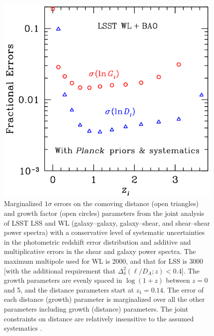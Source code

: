 


\begin{figure}
\includegraphics[width=1.0\hsize,clip]{dges}
\caption{Marginalized $1\sigma$ errors on the comoving distance
(open triangles) and growth factor (open circles) parameters from
the joint analysis of LSST LSS and WL (galaxy--galaxy, galaxy--shear,
and shear--shear power spectra) with a
conservative level of systematic uncertainties in the photometric redshift error
distribution and additive and multiplicative errors in the shear and
galaxy power spectra. The maximum multipole used for WL is
2000, and that for LSS is 3000 [with the additional requirement that
$\Delta_\delta^2(\ell/D_{A};z) < 0.4$].
The growth parameters
are evenly spaced in
$\log(1+z)$ between $z = 0$ and 5, and the distance parameters
start at $z_1 = 0.14$.
The error of each distance (growth) parameter is marginalized
over all the other parameters including growth (distance) parameters. The joint constraints on
distance are relatively insensitive to the assumed systematics
\citep{2009ApJ...690..923Z}.}
\label{Fig:bao2}
\end{figure}


